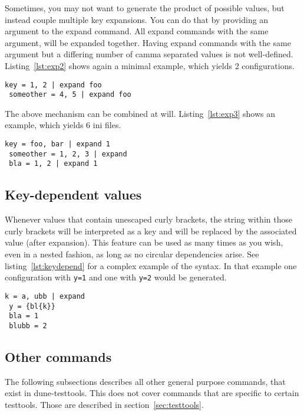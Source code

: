 \documentclass[11pt]{article}
\begin{document}
Sometimes, you may not want to generate the product of possible values, but instead couple multiple key expansions. You can do that by providing an argument to the expand command. All expand commands with the same argument, will be expanded together. Having expand commands with the same argument but a differing number of camma separated values is not well-defined. Listing~\ref{lst:exp2} shows again a minimal example, which yields 2 configurations.

\begin{lstlisting}[caption={A simple example of expanded keys with argument},label=lst:exp2]
 key = 1, 2 | expand foo
 someother = 4, 5 | expand foo
\end{lstlisting}

The above mechanism can be combined at will. Listing~\ref{lst:exp3} shows an example, which yields 6 ini files.

\begin{lstlisting}[caption={A simple combining multiple expansions},label=lst:exp3]
 key = foo, bar | expand 1
 someother = 1, 2, 3 | expand
 bla = 1, 2 | expand 1
\end{lstlisting}

\subsection{Key-dependent values}
\label{sec:keydepend}

Whenever values that contain unescaped curly brackets, the string within those curly brackets will be interpreted as a key and will be replaced by the associated value (after expansion). This feature can be used as many times as you wish, even in a nested fashion, as long as no circular dependencies arise. See listing~\ref{lst:keydepend} for a complex example of the syntax. In that example one configuration with \lstinline!y=1! and one with \lstinline!y=2! would be generated.

\begin{lstlisting}[caption={A complex example of key-dependent value syntax},label=lst:keydepend]
 k = a, ubb | expand
 y = {bl{k}}
 bla = 1
 blubb = 2
\end{lstlisting}

\subsection{Other commands}

The following subsections describes all other general purpose commands, that exist in dune-testtools. This does not cover commands that are specific to certain testtools. Those are described in section~\ref{sec:testtools}.
\end{document}
